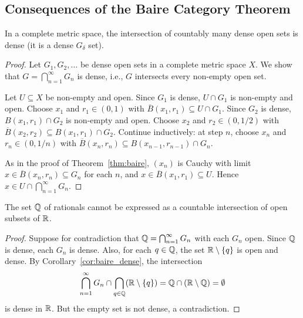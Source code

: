 \documentclass[11pt,a4paper]{article}
\begin{document}
\subsection{Consequences of the Baire Category Theorem}

\begin{corollary}
\label{cor:baire_dense}
In a complete metric space, the intersection of countably many dense open
sets is dense (it is a dense $G_\delta$ set).
\end{corollary}

\begin{proof}
Let $G_1, G_2, \ldots$ be dense open sets in a complete metric space $X$.
We show that $G = \bigcap_{n=1}^\infty G_n$ is dense, i.e., $G$ intersects
every non-empty open set.

Let $U \subseteq X$ be non-empty and open. Since $G_1$ is dense,
$U \cap G_1$ is non-empty and open. Choose $x_1$ and $r_1 \in (0, 1)$ with
$\overline{B}(x_1, r_1) \subseteq U \cap G_1$. Since $G_2$ is dense,
$B(x_1, r_1) \cap G_2$ is non-empty and open. Choose $x_2$ and
$r_2 \in (0, 1/2)$ with
$\overline{B}(x_2, r_2) \subseteq B(x_1, r_1) \cap G_2$. Continue
inductively: at step $n$, choose $x_n$ and $r_n \in (0, 1/n)$ with
$\overline{B}(x_n, r_n) \subseteq B(x_{n-1}, r_{n-1}) \cap G_n$.

As in the proof of Theorem~\ref{thm:baire}, $(x_n)$ is Cauchy with limit
$x \in \overline{B}(x_n, r_n) \subseteq G_n$ for each $n$, and
$x \in \overline{B}(x_1, r_1) \subseteq U$. Hence
$x \in U \cap \bigcap_{n=1}^\infty G_n$.
\end{proof}

\begin{corollary}
\label{cor:Q_not_Gdelta}
The set $\mathbb{Q}$ of rationals cannot be expressed as a countable intersection of
open subsets of $\mathbb{R}$.
\end{corollary}

\begin{proof}
Suppose for contradiction that $\mathbb{Q} = \bigcap_{n=1}^\infty G_n$ with each
$G_n$ open. Since $\mathbb{Q}$ is dense, each $G_n$ is dense. Also, for each
$q \in \mathbb{Q}$, the set $\mathbb{R} \setminus \{q\}$ is open and dense. By
Corollary~\ref{cor:baire_dense}, the intersection
\[
\bigcap_{n=1}^\infty G_n \cap
\bigcap_{q \in \mathbb{Q}} (\mathbb{R} \setminus \{q\})
= \mathbb{Q} \cap (\mathbb{R} \setminus \mathbb{Q})
= \emptyset
\]
is dense in $\mathbb{R}$. But the empty set is not dense, a contradiction.
\end{proof}
\end{document}
